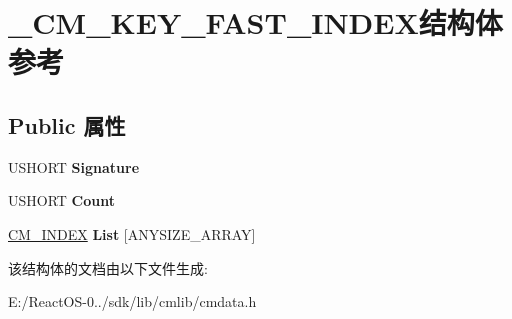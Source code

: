 \hypertarget{struct___c_m___k_e_y___f_a_s_t___i_n_d_e_x}{}\section{\+\_\+\+C\+M\+\_\+\+K\+E\+Y\+\_\+\+F\+A\+S\+T\+\_\+\+I\+N\+D\+E\+X结构体 参考}
\label{struct___c_m___k_e_y___f_a_s_t___i_n_d_e_x}
\subsection*{Public 属性}
\begin{DoxyCompactItemize}
\item 
\mbox{\label{struct___c_m___k_e_y___f_a_s_t___i_n_d_e_x_a42ff1aee172002b2d2760459410d4765}} 
U\+S\+H\+O\+RT {\bfseries Signature}
\item 
\mbox{\label{struct___c_m___k_e_y___f_a_s_t___i_n_d_e_x_aecbe212974ab5cace84a6b35fc1b00f0}} 
U\+S\+H\+O\+RT {\bfseries Count}
\item 
\mbox{\label{struct___c_m___k_e_y___f_a_s_t___i_n_d_e_x_ad626d768802eb32dedc916e3f0e20719}} 
\hyperlink{struct___c_m___i_n_d_e_x}{C\+M\+\_\+\+I\+N\+D\+EX} {\bfseries List} \mbox{[}A\+N\+Y\+S\+I\+Z\+E\+\_\+\+A\+R\+R\+AY\mbox{]}
\end{DoxyCompactItemize}


该结构体的文档由以下文件生成\+:\begin{DoxyCompactItemize}
\item 
E\+:/\+React\+O\+S-\/0../sdk/lib/cmlib/cmdata.\+h\end{DoxyCompactItemize}

